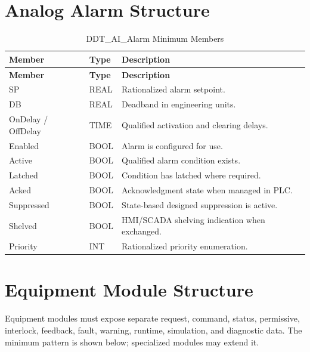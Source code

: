 \section{Analog Alarm Structure}
\begin{longtable}{@{}p{3cm}p{3cm}p{7cm}@{}}
\caption{DDT\_AI\_Alarm Minimum Members}\label{tab:ddt-ai-alarm}\\
\toprule \rowcolor{tblhead}\textbf{Member} & \textbf{Type} & \textbf{Description}\\ \midrule
\endfirsthead
\toprule \rowcolor{tblhead}\textbf{Member} & \textbf{Type} & \textbf{Description}\\ \midrule
\endhead
SP & REAL & Rationalized alarm setpoint.\\
DB & REAL & Deadband in engineering units.\\
OnDelay / OffDelay & TIME & Qualified activation and clearing delays.\\
Enabled & BOOL & Alarm is configured for use.\\
Active & BOOL & Qualified alarm condition exists.\\
Latched & BOOL & Condition has latched where required.\\
Acked & BOOL & Acknowledgment state when managed in PLC.\\
Suppressed & BOOL & State-based designed suppression is active.\\
Shelved & BOOL & HMI/SCADA shelving indication when exchanged.\\
Priority & INT & Rationalized priority enumeration.\\
\bottomrule
\end{longtable}

\section{Equipment Module Structure}
Equipment modules must expose separate request, command, status, permissive, interlock, feedback, fault, warning, runtime, simulation, and diagnostic data. The minimum pattern is shown below; specialized modules may extend it.

